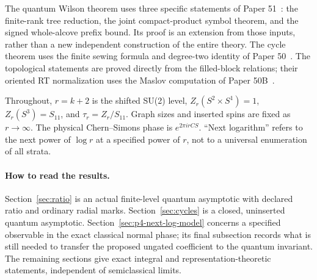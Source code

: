 \documentclass[11pt]{article}
\theoremstyle{remark}\newtheorem{remark}[theorem]{Remark}
\begin{document}
The quantum Wilson theorem uses three specific statements of
Paper 51~\cite{p51}: the finite-rank tree reduction, the joint
compact-product symbol theorem, and the signed whole-alcove prefix
bound. Its proof is an extension from those inputs, rather than a
new independent construction of the entire theory. The cycle theorem
uses the finite sewing formula and degree-two identity of Paper
50~\cite{p50}. The topological statements are proved directly from
the filled-block relations; their oriented RT normalization uses
the Maslov computation of Paper 50B~\cite{p50b}.

Throughout, $r=k+2$ is the shifted SU(2) level,
$Z_r(S^2\times S^1)=1$, $Z_r(S^3)=S_{11}$, and
$\tau_r=Z_r/S_{11}$. Graph sizes and inserted spins are fixed as
$r\to\infty$. The physical Chern--Simons phase is $e^{2\pi i r CS}$.
``Next logarithm'' refers to the next power of $\log r$ at a
specified power of $r$, not to a universal enumeration of all strata.

\paragraph{How to read the results.}
Section~\ref{sec:ratio} is an actual finite-level quantum asymptotic
with declared ratio and ordinary radial marks.
Section~\ref{sec:cycles} is a closed, uninserted quantum asymptotic.
Section~\ref{sec:p4-next-log-model} concerns a specified observable
in the exact classical normal phase; its final subsection records
what is still needed to transfer the proposed ungated coefficient
to the quantum invariant.
The remaining sections give exact integral and representation-theoretic
statements, independent of semiclassical limits.

\tableofcontents
\newpage




\end{document}
